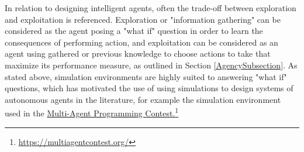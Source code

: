 
 In relation to designing intelligent agents, often the trade-off between exploration and exploitation is referenced. Exploration or "information gathering" \cite{AIAMA} can be considered as the agent posing a "what if" question in order to learn the consequences of performing action, and exploitation can be considered as an agent using gathered or previous knowledge to choose actions to take that maximize its performance measure, as outlined in Section \ref{AgencySubsection}. As stated above, simulation environments are highly suited to answering "what if" questions, which has motivated the use of using simulations to design systems of autonomous agents in the literature, for example the simulation environment used in the 
\href{https://multiagentcontest.org/}{Multi-Agent Programming Contest.}\footnote{\href {https://multiagentcontest.org/}{https://multiagentcontest.org/}}




